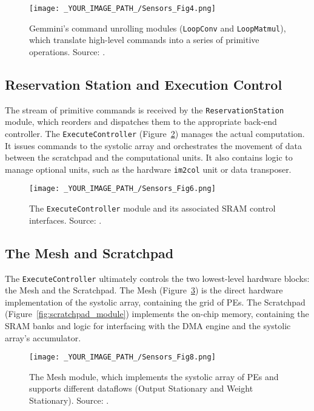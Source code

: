 \begin{figure}[htbp]
    \centering
    \texttt{[image: \_YOUR\_IMAGE\_PATH\_/Sensors\_Fig4.png]}
    \caption{Gemmini's command unrolling modules (\texttt{LoopConv} and \texttt{LoopMatmul}), which translate high-level commands into a series of primitive operations. Source: \cite{gookyi2023gemmini_case_study}.}
    \label{fig:command_unrollers}
\end{figure}

\subsection{Reservation Station and Execution Control}
The stream of primitive commands is received by the \texttt{ReservationStation} module, which reorders and dispatches them to the appropriate back-end controller. The \texttt{ExecuteController} (Figure~\ref{fig:execute_controller}) manages the actual computation. It issues commands to the systolic array and orchestrates the movement of data between the scratchpad and the computational units. It also contains logic to manage optional units, such as the hardware \texttt{im2col} unit or data transposer.

\begin{figure}[htbp]
    \centering
    \texttt{[image: \_YOUR\_IMAGE\_PATH\_/Sensors\_Fig6.png]}
    \caption{The \texttt{ExecuteController} module and its associated SRAM control interfaces. Source: \cite{gookyi2023gemmini_case_study}.}
    \label{fig:execute_controller}
\end{figure}

\subsection{The Mesh and Scratchpad}
The \texttt{ExecuteController} ultimately controls the two lowest-level hardware blocks: the Mesh and the Scratchpad. The Mesh (Figure~\ref{fig:mesh_module}) is the direct hardware implementation of the systolic array, containing the grid of PEs. The Scratchpad (Figure~\ref{fig:scratchpad_module}) implements the on-chip memory, containing the SRAM banks and logic for interfacing with the DMA engine and the systolic array's accumulator.

\begin{figure}[htbp]
    \centering
    \texttt{[image: \_YOUR\_IMAGE\_PATH\_/Sensors\_Fig8.png]}
    \caption{The Mesh module, which implements the systolic array of PEs and supports different dataflows (Output Stationary and Weight Stationary). Source: \cite{gookyi2023gemmini_case_study}.}
    \label{fig:mesh_module}
\end{figure}

